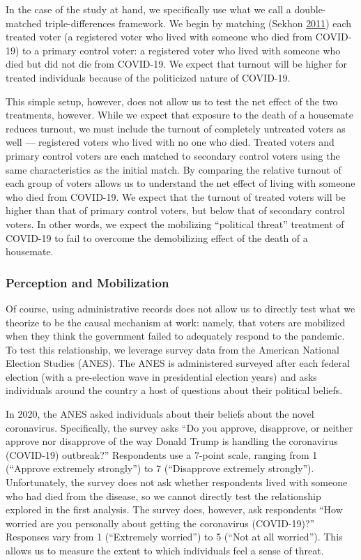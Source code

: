 \documentclass[
  12pt,
]{article}
\begin{document}
In the case of the study at hand, we specifically use what we call a double-matched triple-differences framework. We begin by matching (Sekhon \protect\hyperlink{ref-Sekhon2011}{2011}) each treated voter (a registered voter who lived with someone who died from COVID-19) to a primary control voter: a registered voter who lived with someone who died but did not die from COVID-19. We expect that turnout will be higher for treated individuals because of the politicized nature of COVID-19.

This simple setup, however, does not allow us to test the net effect of the two treatments, however. While we expect that exposure to the death of a housemate reduces turnout, we must include the turnout of completely untreated voters as well --- registered voters who lived with no one who died. Treated voters and primary control voters are each matched to secondary control voters using the same characteristics as the initial match. By comparing the relative turnout of each group of voters allows us to understand the net effect of living with someone who died from COVID-19. We expect that the turnout of treated voters will be higher than that of primary control voters, but below that of secondary control voters. In other words, we expect the mobilizing ``political threat'' treatment of COVID-19 to fail to overcome the demobilizing effect of the death of a housemate.

\hypertarget{perception-and-mobilization}{%
\subsubsection*{Perception and Mobilization}\label{perception-and-mobilization}}

Of course, using administrative records does not allow us to directly test what we theorize to be the causal mechanism at work: namely, that voters are mobilized when they think the government failed to adequately respond to the pandemic. To test this relationship, we leverage survey data from the American National Election Studies (ANES). The ANES is administered surveyed after each federal election (with a pre-election wave in presidential election years) and asks individuals around the country a host of questions about their political beliefs.

In 2020, the ANES asked individuals about their beliefs about the novel coronavirus. Specifically, the survey asks ``Do you approve, disapprove, or neither approve nor disapprove of the way Donald Trump is handling the coronavirus (COVID-19) outbreak?'' Respondents use a 7-point scale, ranging from 1 (``Approve extremely strongly'') to 7 (``Disapprove extremely strongly''). Unfortunately, the survey does not ask whether respondents lived with someone who had died from the disease, so we cannot directly test the relationship explored in the first analysis. The survey does, however, ask respondents ``How worried are you personally about getting the coronavirus (COVID-19)?'' Responses vary from 1 (``Extremely worried'') to 5 (``Not at all worried''). This allows us to measure the extent to which individuals feel a sense of threat.
\end{document}
